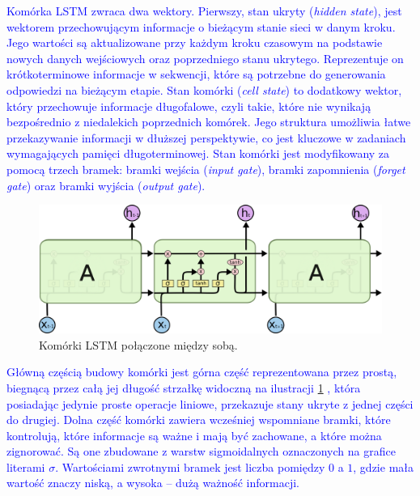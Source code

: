 \documentclass[data-science]{agh-wi} %
\begin{document}
\textcolor{blue}{Komórka LSTM zwraca dwa wektory. Pierwszy, stan ukryty (\textit{hidden state}), jest wektorem przechowującym informacje o bieżącym stanie sieci w danym kroku. Jego wartości są aktualizowane przy każdym kroku czasowym na podstawie nowych danych wejściowych oraz poprzedniego stanu ukrytego. Reprezentuje on krótkoterminowe informacje w sekwencji, które są potrzebne do generowania odpowiedzi na bieżącym etapie. Stan komórki (\textit{cell state}) to dodatkowy wektor, który przechowuje informacje długofalowe, czyli takie, które nie wynikają bezpośrednio z niedalekich poprzednich komórek. Jego struktura umożliwia łatwe przekazywanie informacji w dłuższej perspektywie, co jest kluczowe w zadaniach wymagających pamięci długoterminowej. Stan komórki jest modyfikowany za pomocą trzech bramek: bramki wejścia (\textit{input gate}), bramki zapomnienia (\textit{forget gate}) oraz bramki wyjścia (\textit{output gate}).}

\begin{figure}[ht!]
    \begin{center}
        \includegraphics[width=0.6\linewidth]{./img/LSTM3-chain.png}
    \end{center}
    \caption{Komórki LSTM połączone między sobą.}\label{fig:lstm_chain}
\end{figure}

\textcolor{blue}{Główną częścią budowy komórki jest górna część reprezentowana przez prostą, biegnącą przez całą jej długość strzałkę widoczną na ilustracji \ref*{fig:lstm_chain} \cite{Understanding_lstm}, która posiadając jedynie proste operacje liniowe, przekazuje stany ukryte z jednej części do drugiej. Dolna część komórki zawiera wcześniej wspomniane bramki, które kontrolują, które informacje są ważne i mają być zachowane, a które można zignorować. Są one zbudowane z warstw sigmoidalnych oznaczonych na grafice literami $\sigma$. Wartościami zwrotnymi \textcolor{blue}{bramek} jest liczba pomiędzy $0$ a $1$, gdzie mała wartość znaczy niską, a wysoka -- dużą ważność informacji.} 
\end{document}
